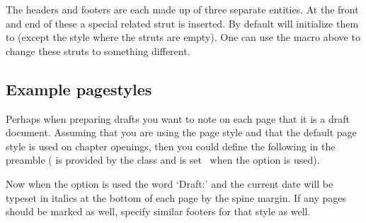 \begin{plainlist}
\begin{syntax}
  \cmd{\makeheadfootstrut}
\end{syntax}
The headers and footers are each made up of three separate
entities. At the front and end of these a special  related
strut is inserted. By default \cmd{\makepagestyle} will initialize
them to \cmd{\strut} (except the  style where the struts
are empty). One can use the macro above to change these struts to
something different.


\subsection{Example pagestyles}

    Perhaps when preparing drafts you want to note on each page
that it is a draft document. Assuming that 
you are using the 
 page style and that the default 
page style is used on chapter openings, then you could define
the following in the preamble ( is provided by
the class and is set \ptrue\ when the  option is used).
\label{ex:draft.pagestyle}
\begin{lcode}
\ifdraftdoc
\fi
\end{lcode}
Now when the  option is used the word `Draft:' and the current
date will be typeset in italics at the bottom of each page by the spine
margin. If any  pages should be marked as well, specify
similar footers for that style as well.


\end{plainlist}
